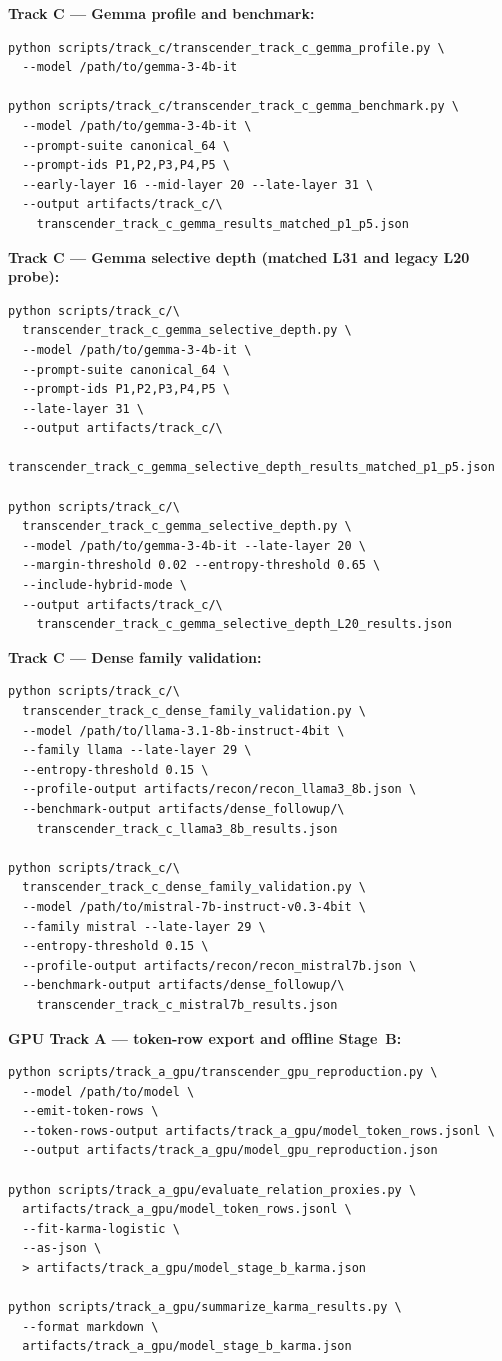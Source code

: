 \documentclass[11pt]{article}
\begin{document}
\noindent\textbf{Track C --- Gemma profile and benchmark:}
{\small
\begin{verbatim}
python scripts/track_c/transcender_track_c_gemma_profile.py \
  --model /path/to/gemma-3-4b-it

python scripts/track_c/transcender_track_c_gemma_benchmark.py \
  --model /path/to/gemma-3-4b-it \
  --prompt-suite canonical_64 \
  --prompt-ids P1,P2,P3,P4,P5 \
  --early-layer 16 --mid-layer 20 --late-layer 31 \
  --output artifacts/track_c/\
    transcender_track_c_gemma_results_matched_p1_p5.json
\end{verbatim}
}

\noindent\textbf{Track C --- Gemma selective depth (matched L31 and legacy L20 probe):}
{\small
\begin{verbatim}
python scripts/track_c/\
  transcender_track_c_gemma_selective_depth.py \
  --model /path/to/gemma-3-4b-it \
  --prompt-suite canonical_64 \
  --prompt-ids P1,P2,P3,P4,P5 \
  --late-layer 31 \
  --output artifacts/track_c/\
    transcender_track_c_gemma_selective_depth_results_matched_p1_p5.json

python scripts/track_c/\
  transcender_track_c_gemma_selective_depth.py \
  --model /path/to/gemma-3-4b-it --late-layer 20 \
  --margin-threshold 0.02 --entropy-threshold 0.65 \
  --include-hybrid-mode \
  --output artifacts/track_c/\
    transcender_track_c_gemma_selective_depth_L20_results.json
\end{verbatim}
}

\noindent\textbf{Track C --- Dense family validation:}
{\small
\begin{verbatim}
python scripts/track_c/\
  transcender_track_c_dense_family_validation.py \
  --model /path/to/llama-3.1-8b-instruct-4bit \
  --family llama --late-layer 29 \
  --entropy-threshold 0.15 \
  --profile-output artifacts/recon/recon_llama3_8b.json \
  --benchmark-output artifacts/dense_followup/\
    transcender_track_c_llama3_8b_results.json

python scripts/track_c/\
  transcender_track_c_dense_family_validation.py \
  --model /path/to/mistral-7b-instruct-v0.3-4bit \
  --family mistral --late-layer 29 \
  --entropy-threshold 0.15 \
  --profile-output artifacts/recon/recon_mistral7b.json \
  --benchmark-output artifacts/dense_followup/\
    transcender_track_c_mistral7b_results.json
\end{verbatim}
}

\noindent\textbf{GPU Track A --- token-row export and offline Stage~B:}
{\small
\begin{verbatim}
python scripts/track_a_gpu/transcender_gpu_reproduction.py \
  --model /path/to/model \
  --emit-token-rows \
  --token-rows-output artifacts/track_a_gpu/model_token_rows.jsonl \
  --output artifacts/track_a_gpu/model_gpu_reproduction.json

python scripts/track_a_gpu/evaluate_relation_proxies.py \
  artifacts/track_a_gpu/model_token_rows.jsonl \
  --fit-karma-logistic \
  --as-json \
  > artifacts/track_a_gpu/model_stage_b_karma.json

python scripts/track_a_gpu/summarize_karma_results.py \
  --format markdown \
  artifacts/track_a_gpu/model_stage_b_karma.json
\end{verbatim}
}
\end{document}
